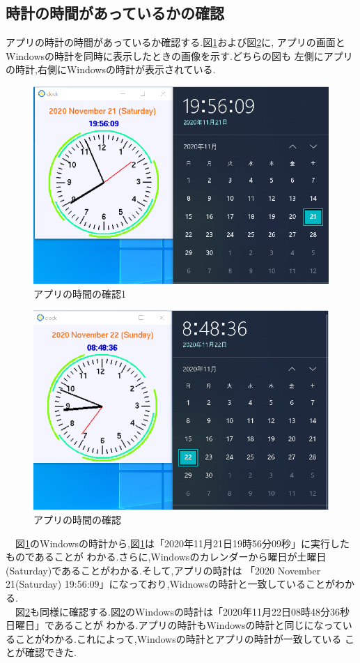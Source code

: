 \documentclass[a4j]{jarticle}
\begin{document}
      \subsection{時計の時間があっているかの確認}
      アプリの時計の時間があっているか確認する.図\ref{time1}および図\ref{time2}に,
      アプリの画面とWindowsの時計を同時に表示したときの画像を示す.どちらの図も
      左側にアプリの時計,右側にWindowsの時計が表示されている.\\
      \begin{figure}[H]
        \centering
        \includegraphics[scale=1.2]{timecheck.eps}
        \caption{アプリの時間の確認1}
         \label{time1}
        \end{figure}

        \begin{figure}[H]
          \centering
          \includegraphics[scale=1.2]{timecheck2.eps}
          \caption{アプリの時間の確認}
           \label{time2}
          \end{figure}
      　図\ref{time1}のWindowsの時計から,図\ref{time1}は「2020年11月21日19時56分09秒」に実行したものであることが
      わかる.さらに,Windowsのカレンダーから曜日が土曜日(Saturday)であることがわかる.そして,アプリの時計は
      「2020 November 21(Saturday) 19:56:09」になっており,Widnowsの時計と一致していることがわかる.\\
      　図\ref{time2}も同様に確認する.図\ref{time2}のWindowsの時計は「2020年11月22日08時48分36秒 日曜日」であることが
      わかる.アプリの時計もWindowsの時計と同じになっていることがわかる.これによって,Windowsの時計とアプリの時計が一致している
      ことが確認できた.
\end{document}
